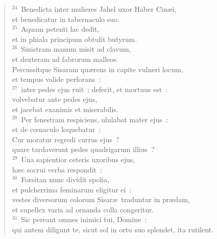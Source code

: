 \begin{flushleft}\begin{verse}${}^{24}$~Benedicta inter mulieres Jahel uxor Haber Cin\ae i,\\ et benedicatur in tabernaculo suo.\\
${}^{25}$~Aquam petenti lac dedit,\\ et in phiala principum obtulit butyrum.\\
${}^{26}$~Sinistram manum misit ad clavum,\\ et dexteram ad fabrorum malleos.\\ Percussitque Sisaram qu\ae rens in capite vulneri locum,\\ et tempus valide perforans~:\\
${}^{27}$~inter pedes ejus ruit~; defecit, et mortuus est~:\\ volvebatur ante pedes ejus,\\ et jacebat exanimis et miserabilis.\\
${}^{28}$~Per fenestram respiciens, ululabat mater ejus~:\\ et de cœnaculo loquebatur~:\\ Cur moratur regredi currus ejus~?\\ quare tardaverunt pedes quadrigarum illius~?\\
${}^{29}$~Una sapientior ceteris uxoribus ejus,\\ h\ae c socrui verba respondit~:\\
${}^{30}$~Forsitan nunc dividit spolia,\\ et pulcherrima feminarum eligitur ei~:\\ vestes diversorum colorum Sisar\ae\ traduntur in pr\ae dam,\\ et supellex varia ad ornanda colla congeritur.\\
${}^{31}$~Sic pereant omnes inimici tui, Domine~:\\ qui autem diligunt te, sicut sol in ortu suo splendet, ita rutilent.\end{verse}\end{flushleft}


